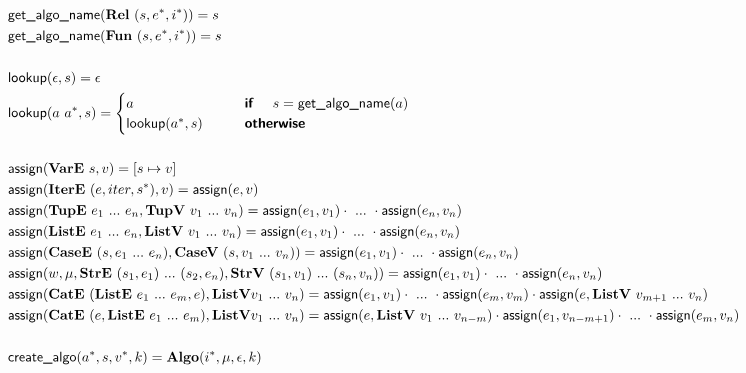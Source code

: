 
\begin{align*}
%
\newline \\
  &\getalgoname(\rel ~ (s, \seq e, \seq i)) = s \\
  &\getalgoname(\fun ~ (s, \seq e, \seq i)) = s \\
%
\newline \\
  &\lookup(\epsilon, s) = \epsilon \\
  &\lookup(a ~ \seq{a}, s) =
    \begin{cases}
      a &\quad\quad \premise{if}\quad ~ s = \getalgoname(a) \\
      \lookup(\seq{a}, s) &\quad\quad \premise{otherwise}
    \end{cases}
  \\
%
\newline \\
  &\assign(\vare ~ s, v) = [s \mapsto v] \\
  &\assign(\itere ~ (e, iter, s^*), v) = \assign(e, v) \\
  &\assign(\tupe ~ e_1 ~ ... ~ e_n, \tupv ~ v_1 ~ ... ~ v_n) =
    \assign(e_1, v_1) \cdot ~ ... ~ \cdot \assign(e_n, v_n) \\
  &\assign(\liste ~ e_1 ~ ... ~ e_n, \listv ~ v_1 ~ ... ~ v_n) =
    \assign(e_1, v_1) \cdot ~ ... ~ \cdot \assign(e_n, v_n) \\
  &\assign(\casee ~ (s, e_1 ~ ... ~ e_n), \casev ~ (s, v_1 ~ ... ~ v_n)) =
    \assign(e_1, v_1) \cdot ~ ... ~ \cdot \assign(e_n, v_n) \\
  &\assign(
    w,
    \mu,
    \stre ~ (s_1, e_1) ~ ... ~ (s_2, e_n),
    \strv ~ (s_1, v_1) ~ ... ~ (s_n, v_n)
  ) =
    \assign(e_1, v_1) \cdot ~ ... ~ \cdot \assign(e_n, v_n) \\
  &\assign(\cate ~ (\liste ~ e_1 ~ ... ~ e_m, e), \listv v_1 ~ ... ~ v_n) =
    \assign(e_1, v_1) \cdot ~ ... ~ \cdot \assign(e_m, v_m) \cdot
    \assign(e, \listv ~ v_{m+1} ~ ... ~ v_n) \\
  &\assign(\cate ~ (e, \liste ~ e_1 ~ ... ~ e_m), \listv v_1 ~ ... ~ v_n) =
    \assign(e, \listv ~ v_1 ~ ... ~ v_{n-m}) \cdot
    \assign(e_1, v_{n-m+1}) \cdot ~ ... ~ \cdot \assign(e_m, v_n) \\
%
\newline \\
  &\createalgo(\seq a, s, \seq v, k) =
  \algo(\seq i, \mu, \epsilon, k) \\

\end{align*}
